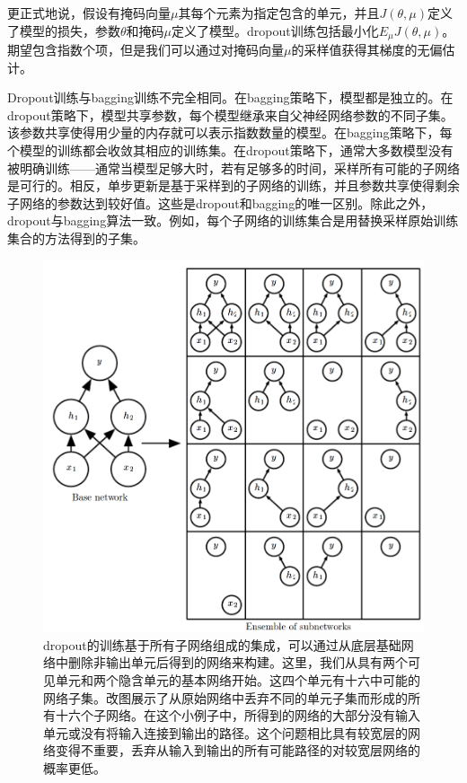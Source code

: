 更正式地说，假设有掩码向量$\mu$其每个元素为指定包含的单元，并且$J(\theta, \mu)$定义了模型的损失，参数$\theta$和掩码$\mu$定义了模型。dropout训练包括最小化$E_{\mu} J(\theta, \mu)$。期望包含指数个项，但是我们可以通过对掩码向量$\mu$的采样值获得其梯度的无偏估计。

Dropout训练与bagging训练不完全相同。在bagging策略下，模型都是独立的。在dropout策略下，模型共享参数，每个模型继承来自父神经网络参数的不同子集。该参数共享使得用少量的内存就可以表示指数数量的模型。在bagging策略下，每个模型的训练都会收敛其相应的训练集。在dropout策略下，通常大多数模型没有被明确训练——通常当模型足够大时，若有足够多的时间，采样所有可能的子网络是可行的。相反，单步更新是基于采样到的子网络的训练，并且参数共享使得剩余子网络的参数达到较好值。这些是dropout和bagging的唯一区别。除此之外，dropout与bagging算法一致。例如，每个子网络的训练集合是用替换采样原始训练集合的方法得到的子集。

\begin{figure}[htbp] %
   \centering
   \includegraphics[width=5in]{fig/chap7/7_6.png} 
   \caption{dropout的训练基于所有子网络组成的集成，可以通过从底层基础网络中删除非输出单元后得到的网络来构建。这里，我们从具有两个可见单元和两个隐含单元的基本网络开始。这四个单元有十六中可能的网络子集。改图展示了从原始网络中丢弃不同的单元子集而形成的所有十六个子网络。在这个小例子中，所得到的网络的大部分没有输入单元或没有将输入连接到输出的路径。这个问题相比具有较宽层的网络变得不重要，丢弃从输入到输出的所有可能路径的对较宽层网络的概率更低。}
   \label{fig:7_6}
\end{figure}

